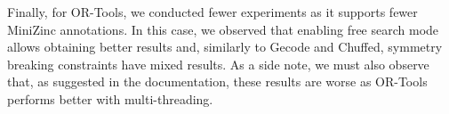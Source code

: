 Finally, for OR-Tools, we conducted fewer experiments as it supports fewer MiniZinc annotations. In this case, we observed that enabling free search mode allows obtaining better results and, similarly to Gecode and Chuffed, symmetry breaking constraints have mixed results. As a side note, we must also observe that, as suggested in the documentation, these results are worse as OR-Tools performs better with multi-threading. 

